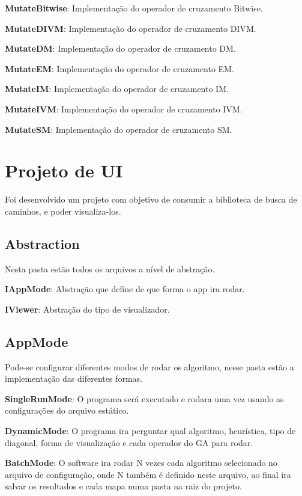 \textbf{MutateBitwise}: Implementação do operador de cruzamento Bitwise.

\textbf{MutateDIVM}: Implementação do operador de cruzamento DIVM.

\textbf{MutateDM}: Implementação do operador de cruzamento DM.

\textbf{MutateEM}: Implementação do operador de cruzamento EM.

\textbf{MutateIM}: Implementação do operador de cruzamento IM.

\textbf{MutateIVM}: Implementação do operador de cruzamento IVM.

\textbf{MutateSM}: Implementação do operador de cruzamento SM.


\section{Projeto de UI}

Foi desenvolvido um projeto com objetivo de consumir a biblioteca de busca de caminhos, e poder visualiza-los.

\subsection{Abstraction}

Nesta pasta estão todos os arquivos a nível de abstração.

\textbf{IAppMode}: Abstração que define de que forma o app ira rodar.

\textbf{IViewer}: Abstração do tipo de visualizador.

\subsection{AppMode}

Pode-se configurar diferentes modos de rodar os algoritmo, nesse pasta estão a implementação das diferentes formas.

\textbf{SingleRunMode}: O programa será executado e rodara uma vez usando as configurações do arquivo estático.

\textbf{DynamicMode}: O programa ira perguntar qual algoritmo, heurística, tipo de diagonal, forma de visualização e cada operador do GA para rodar.

\textbf{BatchMode}: O software ira rodar N vezes cada algoritmo selecionado no arquivo de configuração, onde N também é definido neste arquivo, ao final ira salvar os resultados e cada mapa numa pasta na raiz do projeto.


